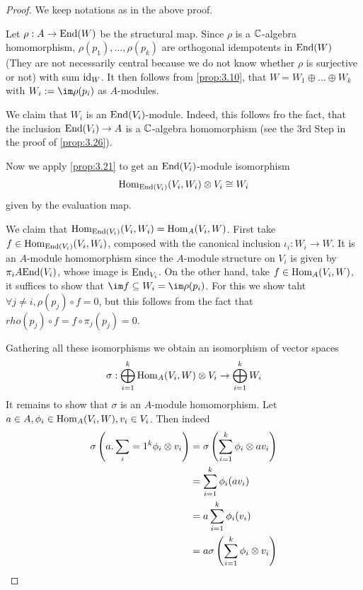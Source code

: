 \documentclass[twoside = false,	%
		headsepline,		%
		parskip = true,
		]{scrbook}						%
\begin{document}
        \begin{proof}
            We keep notations as in the above proof.

            Let $\rho:A\to\mathrm{End}(W)$ be the structural map. Since $\rho$ is a $\mathbb C$-algebra homomorphism, $\rho(p_1), \dots, \rho(p_k)$ are orthogonal idempotents in $\mathrm{End}(W)$ (They are not necessarily central because we do not know whether $\rho$ is surjective or not) with sum $\mathrm{id}_W$. It then follows from \ref{prop:3.10}, that $W=W_1 \oplus \dots \oplus W_k$ with $W_i:=\im \rho(p_i)$ as $A$-modules.

            We claim that $W_i$ is an $\mathrm{End}(V_i)$-module.
            Indeed, this follows fro the fact, that the inclusion $\mathrm{End}(V_i)\to A$ is a $\mathbb C$-algebra homomorphism (see the 3rd Step in the proof of \ref{prop:3.26}).

            Now we apply \ref{prop:3.21} to get an $\mathrm{End}(V_i)$-module isomorphism $$\mathrm{Hom}_{\mathrm{End}(V_i)}(V_i,W_i) \otimes V_i \cong W_i$$ given by the evaluation map.

            We claim that $\mathrm{Hom}_{\mathrm{End}(V_i)}(V_i,W_i) = \mathrm{Hom}_A(V_i,W)$.
            First take $f\in\mathrm{Hom}_{\mathrm{End}(V_i)}(V_i,W_i)$, composed with the canonical inclusion $\iota_i: W_i \to W$. It is an $A$-module homomorphism since the $A$-module structure on $V_i$ is given by $\pi_i A\mathrm{End}(V_i)$, whose image is $\mathrm{End}_{V_i}$.
            On the other hand, take $f\in\mathrm{Hom}_A(V_i,W)$, it suffices to show that $\im f \subseteq W_i = \im \rho(p_i)$. For this we show taht $\forall j \neq i, \rho(p_j)\circ f = 0$, but this follows from the fact that $rho(p_j)\circ f = f\circ \pi_j(p_j) = 0$.

            Gathering all these isomorphisms we obtain an isomorphism of vector spaces $$\sigma: \bigoplus_{i=1}^k \mathrm{Hom}_A(V_i,W) \otimes V_i \to \bigoplus_{i=1}^k W_i$$
            It remains to show that $\sigma$ is an $A$-module homomorphism. Let $a\in A, \phi_i \in \mathrm{Hom}_A(V_i, W), v_i\in V_i$. Then indeed
            \begin{align*}
                \sigma\left( a.\sum_i=1^k\phi_i\otimes v_i\right) &= \sigma\left( \sum_{i=1}^k \phi_i \otimes av_i\right)\\
                &= \sum_{i=1}^k\phi_i(a v_i)\\
                &= a \sum_{i=1}^k \phi_i(v_i)\\
                &= a \sigma\left( \sum_{i=1}^k \phi_i\otimes v_i\right)
            \end{align*}
        \end{proof}
        
\end{document}
